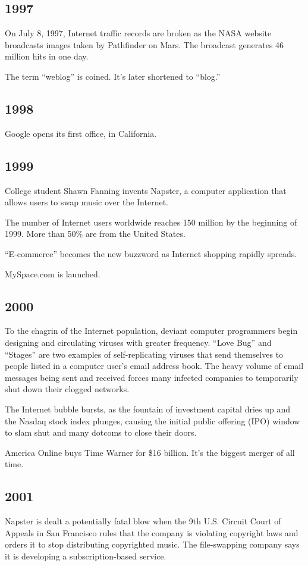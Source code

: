 \documentclass[letterpaper,12pt,english]{sphinxmanual}
\begin{document}
\subsection{1997}
\label{network-timeline:id16}
On July 8, 1997, Internet traffic records are broken as the NASA website broadcasts images taken by Pathfinder on Mars. The broadcast generates 46 million hits in one day.

The term “weblog” is coined. It’s later shortened to “blog.”


\subsection{1998}
\label{network-timeline:id17}
Google opens its first office, in California.


\subsection{1999}
\label{network-timeline:id18}
College student Shawn Fanning invents Napster, a computer application that allows users to swap music over the Internet.

The number of Internet users worldwide reaches 150 million by the beginning of 1999. More than 50\% are from the United States.

“E-commerce” becomes the new buzzword as Internet shopping rapidly spreads.

MySpace.com is launched.


\subsection{2000}
\label{network-timeline:id19}
To the chagrin of the Internet population, deviant computer programmers begin designing and circulating viruses with greater frequency. “Love Bug” and “Stages” are two examples of self-replicating viruses that send themselves to people listed in a computer user's email address book. The heavy volume of email messages being sent and received forces many infected companies to temporarily shut down their clogged networks.

The Internet bubble bursts, as the fountain of investment capital dries up and the Nasdaq stock index plunges, causing the initial public offering (IPO) window to slam shut and many dotcoms to close their doors.

America Online buys Time Warner for \$16 billion. It’s the biggest merger of all time.


\subsection{2001}
\label{network-timeline:id20}
Napster is dealt a potentially fatal blow when the 9th U.S. Circuit Court of Appeals in San Francisco rules that the company is violating copyright laws and orders it to stop distributing copyrighted music. The file-swapping company says it is developing a subscription-based service.
\end{document}
